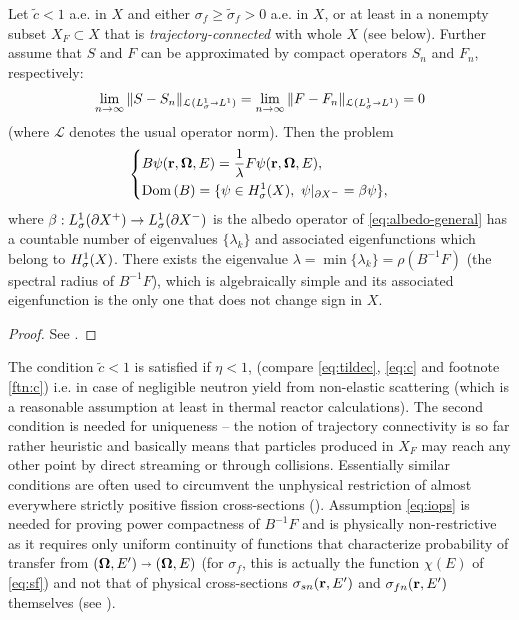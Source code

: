 \begin{theorem}\label{thm:eigenvalue}
	Let $\tilde{c} < 1$ a.e. in $X$ and either $\sigma_f \geq \tilde{\sigma}_f > 0$ a.e. in $X$, or at least in a nonempty
	subset $X_F \subset X$ that is \textit{trajectory-connected} with whole $X$ (see below). 
	Further assume that $S$ and $F$ can be approximated by compact operators $S_n$ and $F_n$, respectively:
\begin{equation}\label{eq:iops}
	\lim_{n\to\infty}\Vert S-S_n\Vert_{\mathcal{L}(\Lp[1]_{\sigma}\sra\Lp[1])} = 
	\lim_{n\to\infty}\Vert F-F_n\Vert_{\mathcal{L}(\Lp[1]_{\sigma}\sra\Lp[1])} = 0
\end{equation}
(where $\mathcal{L}$ denotes the usual operator norm).
Then the problem
\begin{equation*}
\left\{
  \begin{aligned}
     &B\psi(\br,\bomega,E) = \frac{1}{\lambda} F\psi(\br,\bomega,E),\\
     &\Dom{B} = \{\psi\in \Hp[1]_{\sigma}(X),\ \psi\vert_{\pX[-]} = \beta\psi\},
  \end{aligned}
\right.
\end{equation*}
where $\beta : \Lp[1]_{\sigma}(\pX[+]) \to \Lp[1]_{\sigma}(\pX[-])$ is the albedo operator of
\eqref{eq:albedo-general} has a countable number of eigenvalues $\{\lambda_k\}$ and associated eigenfunctions which belong to
$\Hp[1]_{\sigma}(X)$.
There exists the eigenvalue $\lambda = \min \{\lambda_k\} = \rho(B^{-1}F)$ (the spectral radius of $B^{-1}F$), which is
algebraically simple and its associated eigenfunction is the only one that does not change sign in $X$.
\end{theorem}
\begin{proof}
See \cite{Sanchez3}.
\end{proof}
The condition $\tilde{c} < 1$ is satisfied if $\eta < 1$, (compare \eqref{eq:tildec}, \eqref{eq:c} and footnote
\ref{ftn:c}) i.e. in case of negligible neutron yield from non-elastic scattering (which is a reasonable assumption at
least in thermal reactor calculations). The second condition is needed for uniqueness -- the notion of trajectory
connectivity is so far rather heuristic and basically means that particles produced in $X_F$ may reach any other point 
by direct streaming or through collisions. Essentially similar conditions are often used to circumvent the
unphysical restriction of almost everywhere strictly positive fission cross-sections 
(\cite{MokhtarKharroubi,AllaireHomogenization}). Assumption \eqref{eq:iops} is needed for proving power compactness of
$B^{-1}F$ and is physically non-restrictive as it requires only uniform continuity of functions that
characterize probability of transfer from $(\bomega, E') \sra (\bomega,E)$ (for $\sigma_f$, this is actually the
function $\chi(E)$ of \eqref{eq:sf}) and not that of physical cross-sections $\sigma_{sn}(\br,E')$ and
$\sigma_{fn}(\br,E')$ themselves (see \cite{Sanchez3}).
